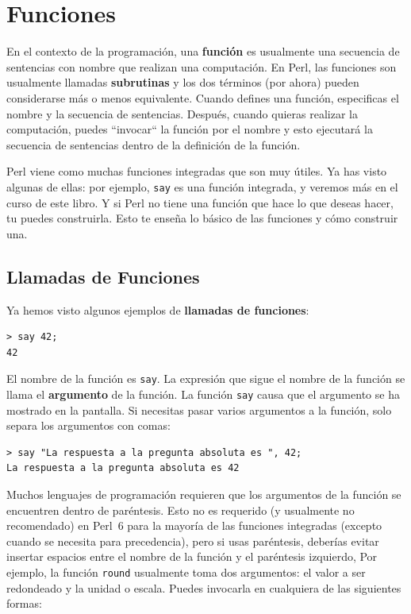 \chapter{Funciones}
\label{funcchap}

En el contexto de la programación, una {\bf función}
es usualmente una secuencia de sentencias con nombre
que realizan una computación. En Perl, las funciones
son usualmente llamadas {\bf subrutinas} y los dos términos
(por ahora) pueden considerarse  más o menos equivalente. Cuando defines
una función, especificas el nombre y la secuencia de sentencias.
Después, cuando quieras realizar la computación, puedes 
``invocar`` la función por el nombre y esto ejecutará la secuencia
de sentencias dentro de la definición de la función.

Perl viene como muchas funciones integradas que son muy útiles.
Ya has visto algunas de ellas: por ejemplo, {\tt say} es una función 
integrada, y veremos más en el curso de este libro. Y si Perl no tiene
una función que hace lo que deseas hacer, tu puedes construirla. Esto
te enseña lo básico de las funciones y cómo construir una.

\section{Llamadas de Funciones}
\label{functionchap}

Ya hemos visto algunos ejemplos de {\bf llamadas de funciones}:

\begin{verbatim}
> say 42;
42
\end{verbatim}
%
El nombre de la función es {\tt say}. La expresión que sigue el
nombre de la función se llama el {\bf argumento} de la función.
La función {\tt say} causa que el argumento se ha mostrado en 
la pantalla. Si necesitas pasar varios argumentos a la función, 
solo separa los argumentos con comas:

\begin{verbatim}
> say "La respuesta a la pregunta absoluta es ", 42;
La respuesta a la pregunta absoluta es 42
\end{verbatim}
%

Muchos lenguajes de programación requieren que los argumentos de
la función se encuentren dentro de paréntesis. Esto no es requerido
(y usualmente no recomendado) en Perl~6 para la mayoría de 
las funciones integradas (excepto cuando se necesita para 
precedencia), pero si usas paréntesis, deberías evitar insertar 
espacios entre el nombre de la función y el paréntesis izquierdo,
Por ejemplo, la función {\tt round} usualmente toma dos argumentos:
el valor a ser redondeado y la unidad o escala.
Puedes invocarla en cualquiera de las siguientes formas:

